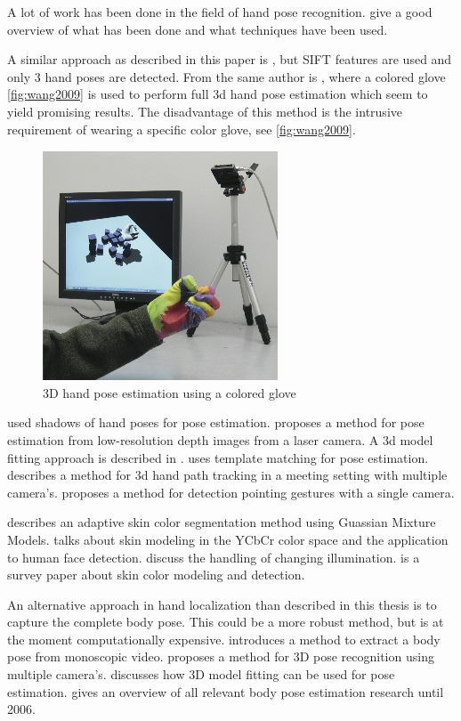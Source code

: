 A lot of work has been done in the field of hand pose recognition. \citep{Erol2007,Mitra2007} give a good overview of what has been done and what techniques have been used.

A similar approach as described in this paper is \citep{Wang2007}, but SIFT features are used and only 3 hand poses are detected. From the same author is \citep{Wang2009}, where a colored glove \autoref{fig:wang2009} is used to perform full 3d hand pose estimation which seem to yield promising results. The disadvantage of this method is the intrusive requirement of wearing a specific color glove, see \autoref{fig:wang2009}.

\begin{figure}[tb]
	\center{}
	\includegraphics[width=0.4\linewidth]{figures/wang2009.jpg}
	\caption{3D hand pose estimation using a colored glove}
	\label{fig:wang2009}
\end{figure}

\citep{Segen1999} used shadows of hand poses for pose estimation. \citep{Mo2006} proposes a method for pose estimation from low-resolution depth images from a laser camera. A 3d model fitting approach is described in \citep{Athitsos2003,laGorce2010}. \citep{Stenger2006} uses template matching for pose estimation. \citep{Xiong2006} describes a method for 3d hand path tracking in a meeting setting with multiple camera's. \citep{Nickel2007} proposes a method for detection pointing gestures with a single camera.

\citep{Hassanpour2008} describes an adaptive skin color segmentation method using Guassian Mixture Models. \citep{Phung2002} talks about skin modeling in the YCbCr color space and the application to human face detection. \citep{Sigal2004,Soriano2000,Stoerring1999} discuss the handling of changing illumination. \citep{Kakumanu2007} is a survey paper about skin color modeling and detection.

An alternative approach in hand localization than described in this thesis is to capture the complete body pose. This could be a more robust method, but is at the moment computationally expensive. \citep{ferrari2008} introduces a method to extract a body pose from monoscopic video. \citep{VandenBergh2009} proposes a method for 3D pose recognition using multiple camera's. \citep{Poppe2007} discusses how 3D model fitting can be used for pose estimation. \citep{Moeslund2006} gives an overview of all relevant body pose estimation research until 2006.

